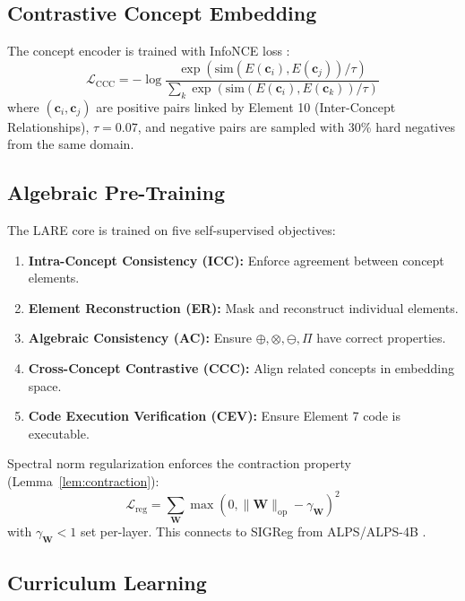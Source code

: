 \documentclass{article}
\newcommand{\bW}{\mathbf{W}}
\newcommand{\bc}{\mathbf{c}}
\begin{document}
\subsection{Contrastive Concept Embedding}

The concept encoder is trained with InfoNCE loss \citep{oord2019representation}:
\begin{equation}
\mathcal{L}_{\text{CCC}} = -\log \frac{\exp(\mathrm{sim}(E(\bc_i), E(\bc_j)) / \tau)}{\sum_{k} \exp(\mathrm{sim}(E(\bc_i), E(\bc_k)) / \tau)}
\end{equation}
where $(\bc_i, \bc_j)$ are positive pairs linked by Element 10 (Inter-Concept Relationships), $\tau = 0.07$, and negative pairs are sampled with 30\% hard negatives from the same domain.

\subsection{Algebraic Pre-Training}

The LARE core is trained on five self-supervised objectives:

\begin{enumerate}[leftmargin=*]
    \item \textbf{Intra-Concept Consistency (ICC):} Enforce agreement between concept elements.
    \item \textbf{Element Reconstruction (ER):} Mask and reconstruct individual elements.
    \item \textbf{Algebraic Consistency (AC):} Ensure $\oplus, \otimes, \ominus, \Pi$ have correct properties.
    \item \textbf{Cross-Concept Contrastive (CCC):} Align related concepts in embedding space.
    \item \textbf{Code Execution Verification (CEV):} Ensure Element 7 code is executable.
\end{enumerate}

Spectral norm regularization enforces the contraction property (Lemma~\ref{lem:contraction}):
\begin{equation}
\mathcal{L}_{\text{reg}} = \sum_{\bW} \max(0, \|\bW\|_{\text{op}} - \gamma_\bW)^2
\end{equation}
with $\gamma_\bW < 1$ set per-layer. This connects to SIGReg from ALPS/ALPS-4B \citep{bardes2024revisiting, klindt2026when}.

\subsection{Curriculum Learning}
\end{document}
